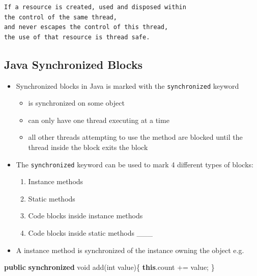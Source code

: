 \documentclass[11pt]{article}
\providecommand{\tightlist}{%
      \setlength{\itemsep}{0pt}\setlength{\parskip}{0pt}}
\newenvironment{Shaded}{}{}
\newcommand{\KeywordTok}[1]{\textcolor[rgb]{0.00,0.44,0.13}{\textbf{{#1}}}}
\newcommand{\DataTypeTok}[1]{\textcolor[rgb]{0.56,0.13,0.00}{{#1}}}
\newcommand{\FunctionTok}[1]{\textcolor[rgb]{0.02,0.16,0.49}{{#1}}}
\newcommand{\NormalTok}[1]{{#1}}
\begin{document}
\begin{verbatim}
If a resource is created, used and disposed within
the control of the same thread,
and never escapes the control of this thread,
the use of that resource is thread safe.
\end{verbatim}

    \hypertarget{java-synchronized-blocks}{%
\subsection{Java Synchronized Blocks}\label{java-synchronized-blocks}}

\begin{itemize}
\tightlist
\item
  Synchronized blocks in Java is marked with the \texttt{synchronized}
  keyword

  \begin{itemize}
  \tightlist
  \item
    is synchronized on some object
  \item
    can only have one thread executing at a time
  \item
    all other threads attempting to use the method are blocked until the
    thread inside the block exits the block
  \end{itemize}
\item
  The \texttt{synchronized} keyword can be used to mark 4 different
  types of blocks:

  \begin{enumerate}
  \def\labelenumi{\arabic{enumi}.}
  \tightlist
  \item
    Instance methods
  \item
    Static methods
  \item
    Code blocks inside instance methods
  \item
    Code blocks inside static methods \_\_\_\\
  \end{enumerate}
\item
  A instance method is synchronized of the instance owning the object
  e.g.
\end{itemize}

\begin{Shaded}
\begin{Highlighting}[]
    \KeywordTok{public} \KeywordTok{synchronized} \DataTypeTok{void} \FunctionTok{add}\NormalTok{(}\DataTypeTok{int}\NormalTok{ value)\{}
        \KeywordTok{this}\NormalTok{.}\FunctionTok{count}\NormalTok{ += value;}
\NormalTok{    \}}
\end{Highlighting}
\end{Shaded}
\end{document}
